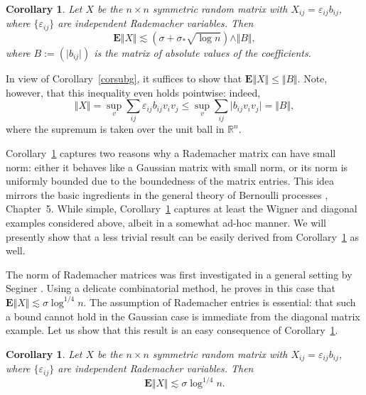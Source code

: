\documentclass[aop,MSNbibl,dvips]{arximspdf}
\newcommand{\rrvert}{\vert}
\newcommand{\rrVert}{\Vert}
\newcommand{\llvert}{\vert}
\newcommand{\llVert}{\Vert}
\newtheorem{cor}[teo]{Corollary}
\newcommand{\EE}{\mathbf{E}}
\begin{document}
%
\begin{cor}
\label{corrad}
Let $X$ be the $n\times n$ symmetric random matrix with
$X_{ij}=\varepsilon_{ij}b_{ij}$, where $\{\varepsilon_{ij}\}$ are
independent Rademacher variables. Then
%
\[
\EE\llVert X\rrVert\lesssim(\sigma+\sigma_*\sqrt{\log n})\wedge\llVert
B\rrVert
, %
\]
%
where $B:=(\llvert b_{ij}\rrvert )$ is the matrix of absolute values
of the coefficients.
\end{cor}

\begin{pf}
In view of Corollary~\ref{corsubg}, it suffices to show that
$\EE\llVert X\rrVert \le\llVert B\rrVert $. Note, however, that
this inequality even holds
pointwise: indeed,
%
\[
\llVert X\rrVert= \sup_v \sum
_{ij} \varepsilon_{ij}b_{ij}v_iv_j
\le\sup_v \sum_{ij} \llvert
b_{ij}v_iv_j\rrvert= \llVert B\rrVert,
%
\]
%
where the supremum is taken over the unit ball in $\mathbb{R}^n$.
\end{pf}

Corollary~\ref{corrad} captures two reasons why a Rademacher matrix can
have small norm: either it behaves like a Gaussian matrix with small norm,
or its norm is uniformly bounded due to the boundedness of the matrix
entries. This idea mirrors the basic ingredients in the general theory of
Bernoulli processes \cite{Tal14}, Chapter~5. While simple,
Corollary~\ref{corrad} captures at least the Wigner and diagonal examples
considered above, albeit in a somewhat ad-hoc manner.
We will presently show that a less trivial result can be easily derived
from Corollary~\ref{corrad} as well.

The norm of Rademacher matrices was first investigated in a general
setting by Seginer \cite{Seg00}. Using a delicate combinatorial method,
he proves in this case that $\EE\llVert X\rrVert \lesssim\sigma\log
^{1/4}n$. The
assumption of Rademacher entries is essential: that such a bound cannot
hold in the Gaussian case is immediate from the diagonal matrix example.
Let us show that this result is an easy consequence of
Corollary~\ref{corrad}.

%
\begin{cor}
\label{corseginer}
Let $X$ be the $n\times n$ symmetric random matrix with
$X_{ij}=\varepsilon_{ij}b_{ij}$, where $\{\varepsilon_{ij}\}$ are
independent Rademacher variables. Then
%
\[
\EE\llVert X\rrVert\lesssim\sigma\log^{1/4}n. %
\]
%
\end{cor}
\end{document}
